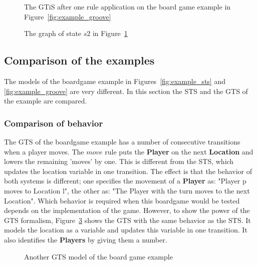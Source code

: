 \begin{figure}[h!]
  \begin{center}
    
  \end{center}
  \caption{The GTiS after one rule application on the board game example in Figure~\ref{fig:example_groove}}
  \label{fig:gtis_example}
\end{figure}

\begin{figure}[h!]
  \begin{center}
    
  \end{center}
  \caption{The graph of state $s2$ in Figure~\ref{fig:gtis_example}}
  \label{fig:target_graph_state}
\end{figure}

\subsection{Comparison of the examples}\label{sec:comparison}
The models of the boardgame example in Figures~\ref{fig:example_sts} and \ref{fig:example_groove} are very different. In this section the STS and the GTS of the example are compared.

\subsubsection{Comparison of behavior}
The GTS of the boardgame example has a number of consecutive transitions when a player moves. The $move$ rule puts the \textbf{Player} on the next \textbf{Location} and lowers the remaining 'moves' by one. This is different from the STS, which updates the location variable in one transition. The effect is that the behavior of both systems is different; one specifies the movement of a \textbf{Player} as: "Player p moves to Location l", the other as: "The Player with the turn moves to the next Location". Which behavior is required when this boardgame would be tested depends on the implementation of the game. However, to show the power of the GTS formalism, Figure~\ref{fig:example_groove2} shows the GTS with the same behavior as the STS. It models the location as a variable and updates this variable in one transition. It also identifies the \textbf{Players} by giving them a number.

\begin{figure}[h]
  \begin{center}
    \quad
  \end{center}
  \caption{Another GTS model of the board game example}
  \label{fig:example_groove2}
\end{figure}

